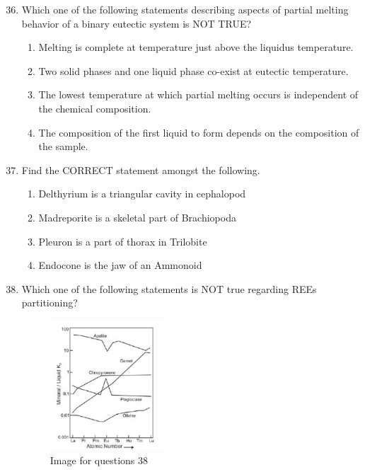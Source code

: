 \documentclass[journal,12pt,onecolumn]{IEEEtran}
\theoremstyle{remark}
\begin{document}
\begin{enumerate}
\setcounter{enumi}{35}

\item Which one of the following statements describing aspects of partial melting behavior of a binary eutectic system is NOT TRUE?  
\begin{enumerate}
\item Melting is complete at temperature just above the liquidus temperature.  
\item Two solid phases and one liquid phase co-exist at eutectic temperature.  
\item The lowest temperature at which partial melting occurs is independent of the chemical composition.  
\item The composition of the first liquid to form depends on the composition of the sample.  
\end{enumerate}

\item Find the CORRECT statement amongst the following.  
\begin{enumerate}
\item Delthyrium is a triangular cavity in cephalopod  
\item Madreporite is a skeletal part of Brachiopoda  
\item Pleuron is a part of thorax in Trilobite  
\item Endocone is the jaw of an Ammonoid  
\end{enumerate}

\item Which one of the following statements is NOT true regarding REEs partitioning?  

\begin{figure}[H]
    \centering
    \includegraphics[width=0.4\textwidth]{figs/fig7.png}
    \caption{Image for questions 38}
    \label{fig:question38}
\end{figure}


\end{enumerate}
\end{document}
